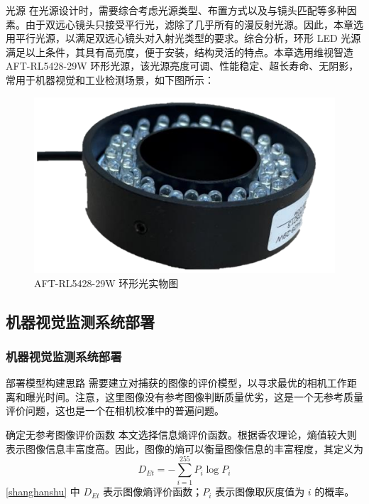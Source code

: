 \documentclass[aspectratio=169,t,xcolor=table,10pt]{ctexbeamer}
\numberwithin{equation}{section} %
\begin{document}
	\begin{frame}[squeeze]
		\begin{block}{光源}
			\qquad 在光源设计时，需要综合考虑光源类型、布置方式以及与镜头匹配等多种因素。由于双远心镜头只接受平行光，滤除了几乎所有的漫反射光源。因此，本章选用平行光源，以满足双远心镜头对入射光类型的要求。综合分析，环形 LED 光源满足以上条件，其具有高亮度，便于安装，结构灵活的特点。本章选用维视智造 AFT-RL5428-29W 环形光源，该光源亮度可调、性能稳定、超长寿命、无阴影，常用于机器视觉和工业检测场景，如下图所示：
			\begin{figure}[H]
				\centering
				\includegraphics[width=0.5\linewidth]{Figure/AFT}
				\caption{AFT-RL5428-29W 环形光实物图}
			\end{figure}
		\end{block}
	\end{frame}

	\subsection{机器视觉监测系统部署}
	\begin{frame}
		\frametitle{机器视觉监测系统部署}
		\begin{block}{部署模型构建思路}
			\qquad 需要建立对捕获的图像的评价模型，以寻求最优的相机工作距离和曝光时间。注意，这里图像没有参考图像判断质量优劣，这是一个无参考质量评价问题，这也是一个在相机校准中的普遍问题。
		\end{block}
		\begin{block}{确定无参考图像评价函数}
			\qquad 本文选择信息熵评价函数。根据香农理论，熵值较大则表示图像信息丰富度高。因此，图像的熵可以衡量图像信息的丰富程度，其定义为
			\begin{equation}
				D_{Et} = -\sum_{i=1}^{255}P_i\log{P_i}
				\label{shanghanshu}
			\end{equation}
			\eqref{shanghanshu} 中 $D_{Et}$ 表示图像熵评价函数；$P_i$ 表示图像取灰度值为 $i$ 的概率。
		\end{block}	
	\end{frame}
	
\end{document}
